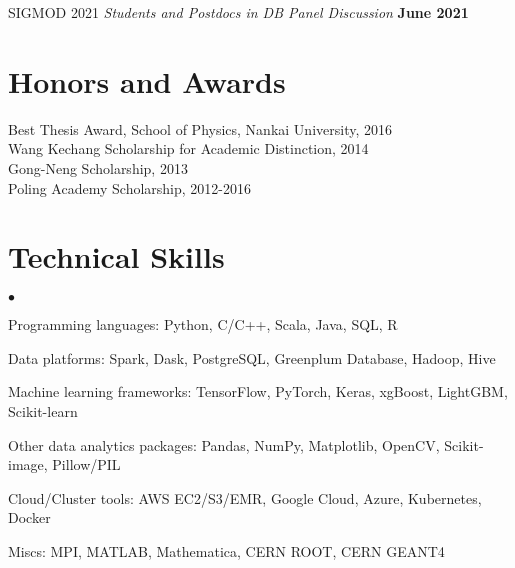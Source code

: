 \documentclass[margin,line]{res}
\newenvironment{list2}{
 \begin{list}{$\bullet$}{%
   \setlength{\itemsep}{0in}
   \setlength{\parsep}{0in} \setlength{\parskip}{0in}
   \setlength{\topsep}{0in} \setlength{\partopsep}{0in} 
   \setlength{\leftmargin}{0.2in}}}{\end{list}}
\begin{document}
\begin{resume}
SIGMOD 2021 \textit{Students and Postdocs in DB Panel Discussion} \hfill {\bf June 2021}


\section{\sc Honors and Awards} 
Best Thesis Award, School of Physics, Nankai University, 2016\\
Wang Kechang Scholarship for Academic Distinction, 2014\\
Gong-Neng Scholarship, 2013\\
Poling Academy Scholarship, 2012-2016


\section{\sc Technical Skills} 
\begin{list2}
\item Programming languages: Python, C/C++, Scala, Java, SQL, R
\item Data platforms: Spark, Dask, PostgreSQL, Greenplum Database, Hadoop, Hive
\item Machine learning frameworks: TensorFlow, PyTorch, Keras, xgBoost, LightGBM, Scikit-learn
\item Other data analytics packages: Pandas, NumPy, Matplotlib, OpenCV, Scikit-image, Pillow/PIL
\item Cloud/Cluster tools: AWS EC2/S3/EMR, Google Cloud, Azure, Kubernetes, Docker
\item Miscs: MPI, MATLAB, Mathematica, CERN ROOT, CERN GEANT4\\ 
\end{list2}



\end{resume}
\end{document}
